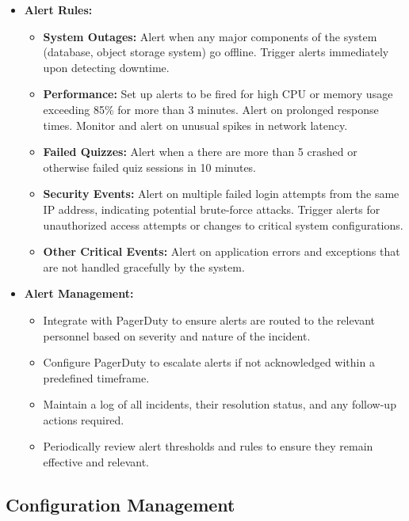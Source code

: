\begin{itemize}
    \item \textbf{Alert Rules:}
          \begin{itemize}
              \item \textbf{System Outages:}
                    Alert when any major components of the system (database, object storage system) go offline. Trigger alerts immediately upon detecting downtime.
              \item \textbf{Performance:}
                    Set up alerts to be fired for high CPU or memory usage exceeding 85\% for more than 3 minutes. Alert on prolonged response times. Monitor and alert on unusual spikes in network latency.
              \item \textbf{Failed Quizzes:}
                    Alert when a there are more than 5 crashed or otherwise failed quiz sessions in 10 minutes.
              \item \textbf{Security Events:}
                    Alert on multiple failed login attempts from the same IP address, indicating potential brute-force attacks.
                    Trigger alerts for unauthorized access attempts or changes to critical system configurations.
              \item \textbf{Other Critical Events:}
                    Alert on application errors and exceptions that are not handled gracefully by the system.
          \end{itemize}
    \item \textbf{Alert Management:}
          \begin{itemize}
              \item Integrate with PagerDuty to ensure alerts are routed to the relevant personnel based on severity and nature of the incident.
              \item Configure PagerDuty to escalate alerts if not acknowledged within a predefined timeframe.
              \item Maintain a log of all incidents, their resolution status, and any follow-up actions required.
              \item Periodically review alert thresholds and rules to ensure they remain effective and relevant.
          \end{itemize}
\end{itemize}


\subsection{Configuration Management}

